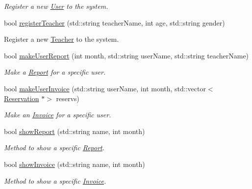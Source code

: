 \begin{DoxyCompactItemize}
\begin{DoxyCompactList}\small\item\em Register a new \mbox{\hyperlink{class_user}{User}} to the system. \end{DoxyCompactList}\item 
bool \mbox{\hyperlink{class_company_afd7f0c326672c6bb6a23d5921503bc0d}{register\+Teacher}} (std\+::string teacher\+Name, int age, std\+::string gender)
\begin{DoxyCompactList}\small\item\em 
\begin{DoxyItemize}
\item Register a new \mbox{\hyperlink{class_teacher}{Teacher}} to the system. 
\end{DoxyItemize}\end{DoxyCompactList}\item 
bool \mbox{\hyperlink{class_company_acc2aba7c2f4149021e9b93ab423e417b}{make\+User\+Report}} (int month, std\+::string user\+Name, std\+::string teacher\+Name)
\begin{DoxyCompactList}\small\item\em Make a \mbox{\hyperlink{class_report}{Report}} for a specific user. \end{DoxyCompactList}\item 
bool \mbox{\hyperlink{class_company_a0d3e4de51625c91610516fba5aac7acf}{make\+User\+Invoice}} (std\+::string user\+Name, int month, std\+::vector$<$ \mbox{\hyperlink{class_reservation}{Reservation}} $\ast$$>$ reservs)
\begin{DoxyCompactList}\small\item\em Make an \mbox{\hyperlink{class_invoice}{Invoice}} for a specific user. \end{DoxyCompactList}\item 
bool \mbox{\hyperlink{class_company_a2c00c88b245aef0e0e52864b585f8f6b}{show\+Report}} (std\+::string name, int month)
\begin{DoxyCompactList}\small\item\em Method to show a specific \mbox{\hyperlink{class_report}{Report}}. \end{DoxyCompactList}\item 
bool \mbox{\hyperlink{class_company_ad3d0ab0209f13ca48a83df34564ef055}{show\+Invoice}} (std\+::string name, int month)
\begin{DoxyCompactList}\small\item\em Method to show a specific \mbox{\hyperlink{class_invoice}{Invoice}}. \end{DoxyCompactList}\item 
$$
\end{DoxyCompactItemize}
